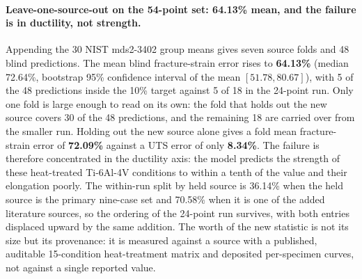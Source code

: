 \documentclass[12pt,a4paper,twocolumn]{article}
\begin{document}
\paragraph{Leave-one-source-out on the 54-point set: 64.13\% mean, and the failure is in ductility, not strength.} Appending the 30 NIST mds2-3402 group means gives seven source folds and 48 blind predictions. The mean blind fracture-strain error rises to \textbf{64.13\%} (median 72.64\%, bootstrap 95\% confidence interval of the mean $[51.78, 80.67]$), with 5 of the 48 predictions inside the 10\% target against 5 of 18 in the 24-point run. Only one fold is large enough to read on its own: the fold that holds out the new source covers 30 of the 48 predictions, and the remaining 18 are carried over from the smaller run. Holding out the new source alone gives a fold mean fracture-strain error of \textbf{72.09\%} against a UTS error of only \textbf{8.34\%}. The failure is therefore concentrated in the ductility axis: the model predicts the strength of these heat-treated Ti-6Al-4V conditions to within a tenth of the value and their elongation poorly. The within-run split by held source is 36.14\% when the held source is the primary nine-case set and 70.58\% when it is one of the added literature sources, so the ordering of the 24-point run survives, with both entries displaced upward by the same addition. The worth of the new statistic is not its size but its provenance: it is measured against a source with a published, auditable 15-condition heat-treatment matrix and deposited per-specimen curves, not against a single reported value.
\end{document}
